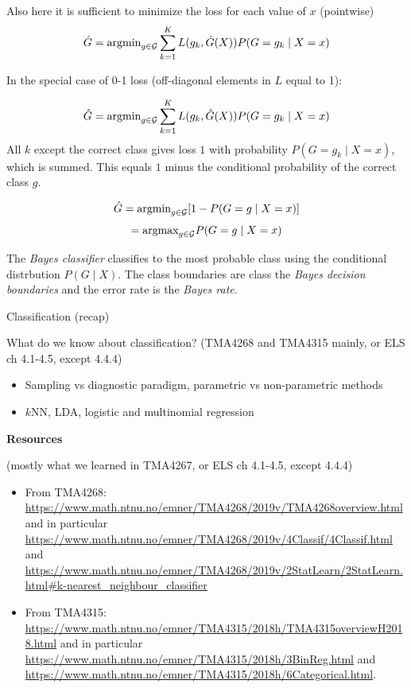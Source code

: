 \documentclass[
  ignorenonframetext,
]{beamer}
\providecommand{\tightlist}{%
  \setlength{\itemsep}{0pt}\setlength{\parskip}{0pt}}
\begin{document}
\begin{frame}

Also here it is sufficient to minimize the loss for each value of \(x\)
(pointwise)
\[ \hat{G}=\text{argmin}_{g \in {\cal G}}\sum_{k=1}^K L(g_k,\hat{G}(X))P(G=g_k \mid X=x) \]

In the special case of 0-1 loss (off-diagonal elements in \(L\) equal to
1):

\[ \hat{G}=\text{argmin}_{g \in {\cal G}}\sum_{k=1}^K L(g_k,\hat{G}(X))P(G=g_k \mid X=x)\]
All \(k\) except the correct class gives loss \(1\) with probability
\(P(G=g_k \mid X=x)\), which is summed. This equals \(1\) minus the
conditional probability of the correct class \(g\).

\end{frame}

\begin{frame}

\[\hat{G}=\text{argmin}_{g \in {\cal G}} [1-P(G=g \mid X=x)]\]
\[=\text{argmax}_{g \in {\cal G}}P(G=g \mid X=x)\]

The \emph{Bayes classifier} classifies to the most probable class using
the conditional distrbution \(P(G \mid X)\). The class boundaries are
class the \emph{Bayes decision boundaries} and the error rate is the
\emph{Bayes rate}.

\end{frame}

\begin{frame}

\begin{block}{Classification (recap)}

What do we know about classification? (TMA4268 and TMA4315 mainly, or
ELS ch 4.1-4.5, except 4.4.4)

\begin{itemize}
\tightlist
\item
  Sampling vs diagnostic paradigm, parametric vs non-parametric methods
\item
  \(k\)NN, LDA, logistic and multinomial regression
\end{itemize}

\textbf{Resources}

(mostly what we learned in TMA4267, or ELS ch 4.1-4.5, except 4.4.4)

\begin{itemize}
\tightlist
\item
  From TMA4268:
  \url{https://www.math.ntnu.no/emner/TMA4268/2019v/TMA4268overview.html}
  and in particular
  \url{https://www.math.ntnu.no/emner/TMA4268/2019v/4Classif/4Classif.html}
  and
  \url{https://www.math.ntnu.no/emner/TMA4268/2019v/2StatLearn/2StatLearn.html\#k-nearest_neighbour_classifier}
\item
  From TMA4315:
  \url{https://www.math.ntnu.no/emner/TMA4315/2018h/TMA4315overviewH2018.html}
  and in particular
  \url{https://www.math.ntnu.no/emner/TMA4315/2018h/3BinReg.html} and
  \url{https://www.math.ntnu.no/emner/TMA4315/2018h/6Categorical.html}.
\end{itemize}

\end{block}

\end{frame}
\end{document}
